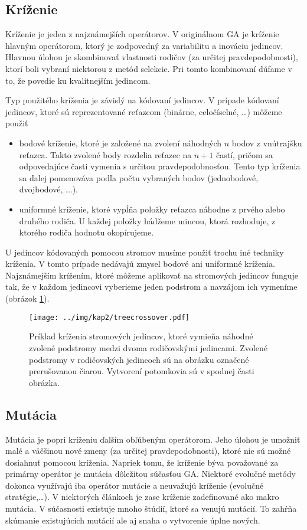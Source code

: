 \subsection{Kríženie}
Kríženie je jeden z najznámejších operátorov. V originálnom GA je kríženie hlavným operátorom, ktorý je zodpovedný za variabilitu a inováciu jedincov. Hlavnou úlohou je skombinovať vlastnosti rodičov (za určitej pravdepodobnosti), ktorí boli vybraní niektorou z metód selekcie. Pri tomto kombinovaní dúfame v to, že povedie ku kvalitnejším jedincom.

Typ použitého kríženia je závislý na kódovaní jedincov.
V prípade kódovaní jedincov, ktoré sú reprezentované reťazcom (binárne, celočíselné, \ldots) môžeme použiť
\begin{itemize}\label{kap2:2.5:2.5.1:Crossover}
\item bodové kríženie, ktoré je založené na zvolení náhodných $n$ bodov z vnútrajšku reťazca. Takto zvolené body rozdelia reťazec na $n+1$ častí, pričom sa odpovedajúce časti vymenia s určitou pravdepodobnosťou. Tento typ kríženia sa ďalej pomenováva podľa počtu vybraných bodov (jednobodové, dvojbodové, ...).
\item uniformné kríženie, ktoré vypĺňa položky reťazca náhodne z prvého alebo druhého rodiča. U každej položky hádžeme mincou, ktorá rozhoduje, z ktorého rodiča hodnotu okopírujeme.
\end{itemize}
U jedincov kódovaných pomocou stromov musíme použiť trochu iné techniky kríženia. V tomto prípade nedávajú zmysel bodové ani uniformné kríženia. Najznámejším krížením, ktoré môžeme aplikovať na stromových jedincov funguje tak, že v každom jedincovi vyberieme jeden podstrom a navzájom ich vymeníme (obrázok \ref{fig:TreeCrossover}).

\begin{figure}[h]
\centering
\centerline{\mbox{\texttt{[image: ../img/kap2/treecrossover.pdf]}}}
\caption{Príklad kríženia stromových jedincov, ktoré vymieňa náhodné zvolené podstromy medzi dvoma rodičovskými jedincami. Zvolené podstromy v rodičovských jedincoch sú na obrázku označené prerušovanou čiarou. Vytvorení potomkovia sú v spodnej časti obrázka.}\label{fig:TreeCrossover}
\end{figure}

\subsection{Mutácia}\label{kap2:2.5:2.5.2:Mutation}
Mutácia je popri kríženiu ďalším obľúbeným operátorom. Jeho úlohou je umožniť malé a väčšinou nové zmeny (za určitej pravdepodobnosti), ktoré nie sú možné dosiahnuť pomocou kríženia. Napriek tomu, že kríženie býva považované za primárny operátor je mutácia dôležitou súčasťou GA. Niektoré evolučné metódy dokonca využívajú iba operátor mutácie a neuvažujú kríženie (evolučné stratégie,\ldots). V niektorých článkoch je zase kríženie zadefinované ako makro mutácia. V súčasnosti existuje mnoho štúdií, ktoré sa venujú mutácií. To zahŕňa skúmanie existujúcich mutácií ale aj snaha o vytvorenie úplne nových. 

